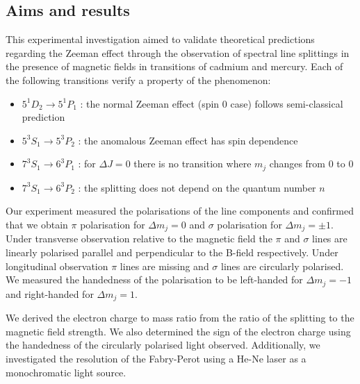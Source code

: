 \documentclass[11pt]{article}
\begin{document}
\subsection{Aims and results}
This experimental investigation aimed to validate theoretical predictions regarding the Zeeman effect through the observation of spectral line splittings in the presence of magnetic fields in transitions of cadmium and mercury. Each of the following transitions verify a property of the phenomenon: 
\begin{itemize}
    \item $5^1 D_2 \rightarrow 5^1 P_1$ : the normal Zeeman effect (spin 0 case) follows semi-classical prediction
    \item $5^3 S_1 \rightarrow 5^3 P_2$ : the anomalous Zeeman effect has spin dependence
    \item $7^3 S_1 \rightarrow 6^3 P_1$ : for $\Delta J = 0$ there is no transition where $m_j$ changes from 0 to 0
    \item $7^3 S_1 \rightarrow 6^3 P_2$ : the splitting does not depend on the quantum number $n$
\end{itemize}
Our experiment measured the polarisations of the line components and confirmed that we obtain $\pi$ polarisation for $\Delta m_j = 0$ and $\sigma$ polarisation for $\Delta m_j = \pm 1$. Under transverse observation relative to the magnetic field the $\pi$ and $\sigma$ lines are linearly polarised parallel and perpendicular to the B-field respectively. Under longitudinal observation $\pi$ lines are missing and $\sigma$ lines are circularly polarised. We measured the handedness of the polarisation to be left-handed for $\Delta m_j = -1$ and right-handed for $\Delta m_j = 1$. 

We derived the electron charge to mass ratio from the ratio of the splitting to the magnetic field strength. We also determined the sign of the electron charge using the handedness of the circularly polarised light observed. Additionally, we investigated  the resolution of the Fabry-Perot using a He-Ne laser as a monochromatic light source. 




\newpage

\appendix
\end{document}
